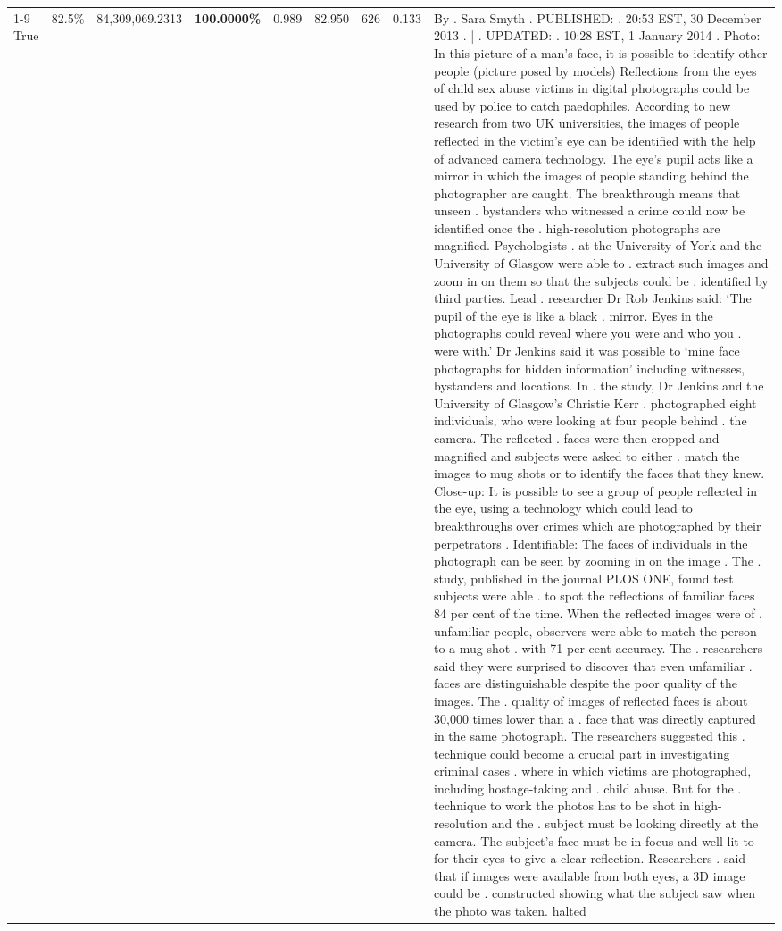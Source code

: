 \begin{table}[H]
\begin{tabular}{lllrlllll}
\cline{1-9} \cline{2-9}
True & 82.5\% & 84,309,069.2313 & \bfseries \color{red} 100.0000\% & 0.989 & 82.950 & 626 & 0.133 & By . Sara Smyth . PUBLISHED: . 20:53 EST, 30 December 2013 . | . UPDATED: . 10:28 EST, 1 January 2014 . Photo: In this picture of a man's face, it is possible to identify other people (picture posed by models) Reflections from the eyes of child sex abuse victims in digital photographs could be used by police to catch paedophiles. According to new research from two UK universities, the images of people reflected in the victim's eye can be identified with the help of advanced camera technology. The eye's pupil acts like a mirror in which the images of people standing behind the photographer are caught. The breakthrough means that unseen . bystanders who witnessed a crime could now be identified once the . high-resolution photographs are magnified. Psychologists . at the University of York and the University of Glasgow were able to . extract such images and zoom in on them so that the subjects could be . identified by third parties. Lead . researcher Dr Rob Jenkins said: ‘The pupil of the eye is like a black . mirror. Eyes in the photographs could reveal where you were and who you . were with.' Dr Jenkins said it was possible to ‘mine face photographs for hidden information' including witnesses, bystanders and locations. In . the study, Dr Jenkins and the University of Glasgow's Christie Kerr . photographed eight individuals, who were looking at four people behind . the camera. The reflected . faces were then cropped and magnified and subjects were asked to either . match the images to mug shots or to identify the faces that they knew. Close-up: It is possible to see a group of people reflected in the eye, using a technology which could lead to breakthroughs over crimes which are photographed by their perpetrators . Identifiable: The faces of individuals in the photograph can be seen by zooming in on the image . The . study, published in the journal PLOS ONE, found test subjects were able . to spot the reflections of familiar faces 84 per cent of the time. When the reflected images were of . unfamiliar people, observers were able to match the person to a mug shot . with 71 per cent accuracy. The . researchers said they were surprised to discover that even unfamiliar . faces are distinguishable despite the poor quality of the images. The . quality of images of reflected faces is about 30,000 times lower than a . face that was directly captured in the same photograph. The researchers suggested this . technique could become a crucial part in investigating criminal cases . where in which victims are photographed, including hostage-taking and . child abuse. But for the . technique to work the photos has to be shot in high-resolution and the . subject must be looking directly at the camera. The subject's face must be in focus and well lit to for their eyes to give a clear reflection. Researchers . said that if images were available from both eyes, a 3D image could be . constructed showing what the subject saw when the photo was taken. halted \\

\end{tabular}
\end{table}
